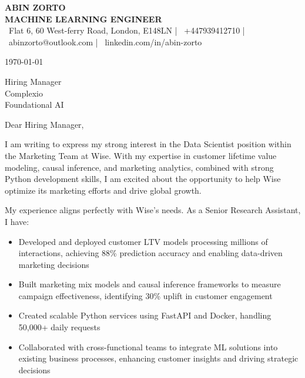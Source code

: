 \documentclass[10pt,a4paper]{article}
\begin{document}

\begin{center}
    {\color{primary}\Large\textbf{ABIN ZORTO}}\\[0.2em]
    {\color{secondary}\large\textbf{MACHINE LEARNING ENGINEER}}\\[0.3em]
    
    \small\color{secondary}
    \faMapMarker\ Flat 6, 60 West-ferry Road, London, E148LN |
    \faMobile\ +447939412710 |
    \faEnvelope\ abinzorto@outlook.com |
    \faLinkedin\ linkedin.com/in/abin-zorto
\end{center}

\vspace{1em}
\today

\vspace{1em}
Hiring Manager\\
Complexio\\
Foundational AI

\vspace{1em}
Dear Hiring Manager,

I am writing to express my strong interest in the Data Scientist position within the Marketing Team at Wise. With my expertise in customer lifetime value modeling, causal inference, and marketing analytics, combined with strong Python development skills, I am excited about the opportunity to help Wise optimize its marketing efforts and drive global growth.

My experience aligns perfectly with Wise's needs. As a Senior Research Assistant, I have:

\begin{itemize}
    \item Developed and deployed customer LTV models processing millions of interactions, achieving 88\% prediction accuracy and enabling data-driven marketing decisions
    \item Built marketing mix models and causal inference frameworks to measure campaign effectiveness, identifying 30\% uplift in customer engagement
    \item Created scalable Python services using FastAPI and Docker, handling 50,000+ daily requests
    \item Collaborated with cross-functional teams to integrate ML solutions into existing business processes, enhancing customer insights and driving strategic decisions
\end{itemize}
\end{document}
